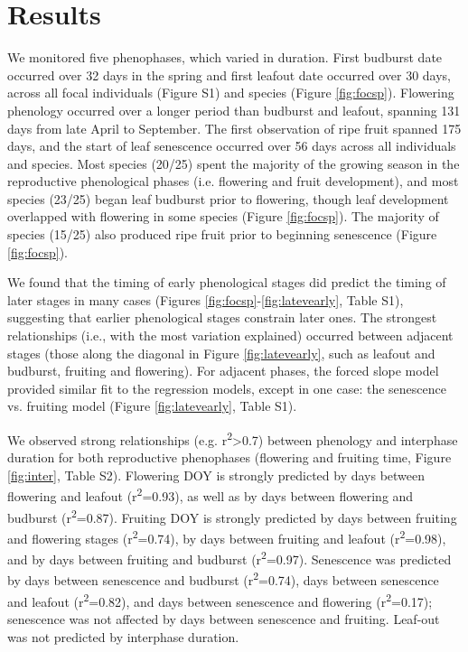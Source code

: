 \documentclass{article}
\begin{document}
\section* {Results}
\par We monitored five phenophases, which varied in duration. First budburst date occurred over 32 days in the spring and first leafout date occurred over 30 days, across all focal individuals (Figure S1) and species (Figure \ref{fig:focsp}). Flowering phenology occurred over a longer period than budburst and leafout, spanning 131 days from late April to September. The first observation of ripe fruit spanned 175 days, and the start of leaf senescence occurred over 56 days across all individuals and species. Most species (20/25) spent the majority of the growing season in the reproductive phenological phases (i.e. flowering and fruit development), and most species (23/25) began leaf budburst prior to flowering, though leaf development overlapped with flowering in some species (Figure \ref{fig:focsp}). The majority of species (15/25) also produced ripe fruit prior to beginning senescence (Figure \ref{fig:focsp}).
\par We found that the timing of early phenological stages did predict the timing of later stages in many cases (Figures \ref{fig:focsp}-\ref{fig:latevearly}, Table S1), suggesting that earlier phenological stages constrain later ones. The strongest relationships (i.e., with the most variation explained) occurred between adjacent stages (those along the diagonal in Figure \ref{fig:latevearly}, such as leafout and budburst, fruiting and flowering). For adjacent phases, the forced slope model provided similar fit to the regression models, except in one case: the senescence vs. fruiting model (Figure \ref{fig:latevearly}, Table S1). 

\par We observed strong relationships (e.g. r\textsuperscript{2}>0.7) between phenology and interphase duration for both reproductive phenophases (flowering and fruiting time, Figure \ref{fig:inter}, Table S2). Flowering DOY is strongly predicted by days between flowering and leafout (r\textsuperscript{2}=0.93), as well as by days between flowering and budburst (r\textsuperscript{2}=0.87). Fruiting DOY is strongly predicted by days between fruiting and flowering stages (r\textsuperscript{2}=0.74), by days between fruiting and leafout (r\textsuperscript{2}=0.98), and by days between fruiting and budburst (r\textsuperscript{2}=0.97). Senescence was predicted by days between senescence and budburst (r\textsuperscript{2}=0.74), days between senescence and leafout (r\textsuperscript{2}=0.82), and days between senescence and flowering (r\textsuperscript{2}=0.17); senescence was not affected by days between senescence and fruiting.  Leaf-out was not predicted by interphase duration. 
\end{document}
